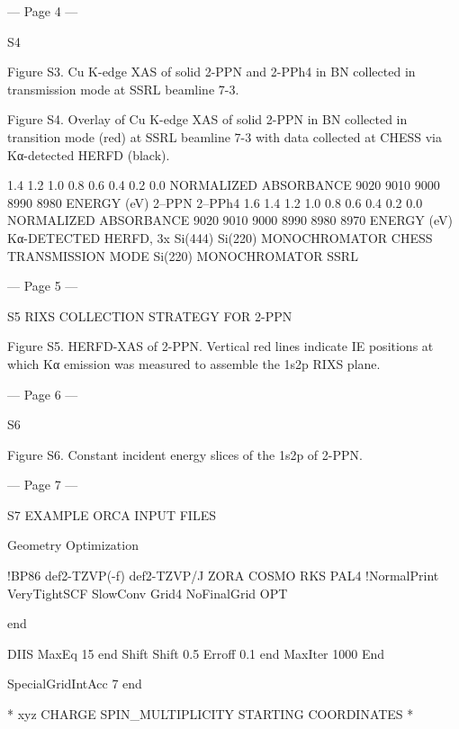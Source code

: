 --- Page 4 ---
 
S4 
 
Figure S3. Cu K-edge XAS of solid 2-PPN and 2-PPh4 in BN collected in transmission mode at 
SSRL beamline 7-3. 
 
 
Figure S4. Overlay of Cu K-edge XAS of solid 2-PPN in BN collected in transition mode (red) 
at SSRL beamline 7-3 with data collected at CHESS via Kα-detected HERFD (black). 
 
1.4
1.2
1.0
0.8
0.6
0.4
0.2
0.0
NORMALIZED ABSORBANCE
9020
9010
9000
8990
8980
ENERGY (eV)
 2–PPN
 2–PPh4
1.6
1.4
1.2
1.0
0.8
0.6
0.4
0.2
0.0
NORMALIZED ABSORBANCE
9020
9010
9000
8990
8980
8970
ENERGY (eV)
 Kα-DETECTED HERFD, 3x Si(444)
         Si(220) MONOCHROMATOR
         CHESS
  TRANSMISSION MODE
  Si(220) MONOCHROMATOR
  SSRL


--- Page 5 ---
 
S5 
RIXS COLLECTION STRATEGY FOR 2-PPN 
 
 
Figure S5. HERFD-XAS of 2-PPN. Vertical red lines indicate IE positions at which Kα 
emission was measured to assemble the 1s2p RIXS plane. 
 
 


--- Page 6 ---
 
S6 
 
Figure S6. Constant incident energy slices of the 1s2p of 2-PPN. 
 
 


--- Page 7 ---
 
S7 
EXAMPLE ORCA INPUT FILES 
 
Geometry Optimization 
 
!BP86 def2-TZVP(-f) def2-TZVP/J ZORA COSMO RKS PAL4 
!NormalPrint VeryTightSCF SlowConv Grid4 NoFinalGrid OPT 
 
 end 
 
      DIIS MaxEq 15 
           end 
      Shift Shift 0.5 
            Erroff 0.1 
            end 
      MaxIter 1000 
      End 
 
        SpecialGridIntAcc 7 
        end 
   
 
 
* xyz CHARGE SPIN_MULTIPLICITY 
STARTING COORDINATES 
* 
 
 
 
 
 
 
 
 
 
 
 
 
 
